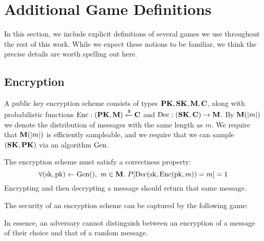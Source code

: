 \section{Additional Game Definitions}

In this section, we include explicit definitions of several games we
use throughout the rest of this work.
While we expect these notions to be familiar, we think the precise
details are worth spelling out here.

\subsection{Encryption}
\label{app:encryption}
A public key encryption scheme consists of types $\textbf{PK}, \textbf{SK}, \textbf{M}, \textbf{C}$,
along with probabilistic functions $\text{Enc} : (\textbf{PK}, \textbf{M}) \xleftarrow{\$} \textbf{C}$ and $\text{Dec} : (\textbf{SK}, \textbf{C}) \to \textbf{M}$.
By $\textbf{M}(|m|)$ we denote the distribution of messages with the same
length as $m$.
We require that $\textbf{M}(|m|)$ is efficiently sampleable,
and we require that we can sample $(\textbf{SK}, \textbf{PK})$ via an algorithm
$\text{Gen}$.

The encryption scheme must satisfy a correctness property:
$$
\forall (\text{sk}, \text{pk}) \gets \text{Gen}(),\ m \in \textbf{M}.\ P[\text{Dec}(\text{sk}, \text{Enc}(\text{pk}, m)) = m] = 1
$$
Encrypting and then decrypting a message should return that same message.

The security of an encryption scheme can be captured by the following game:

In essence, an adversary cannot distinguish between an encryption of a message
of their choice and that of a random message.
